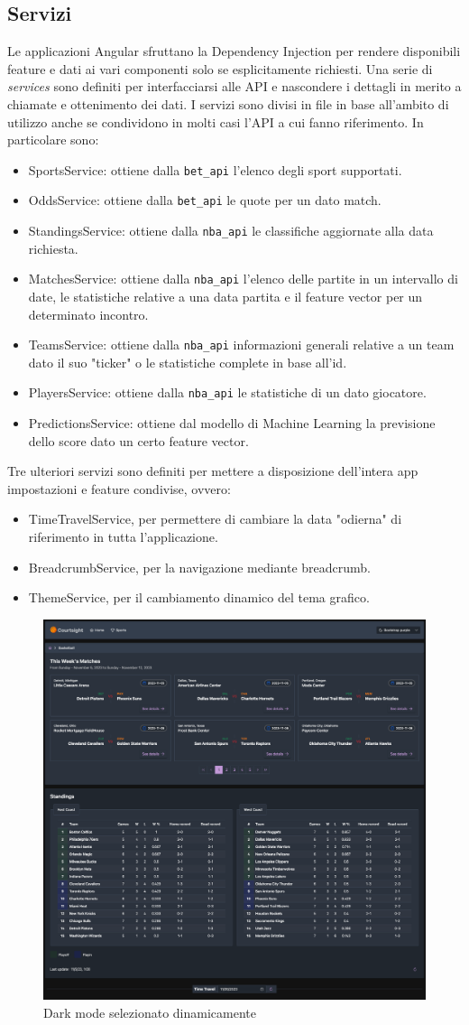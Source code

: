 \subsection{Servizi}
Le applicazioni Angular sfruttano la Dependency Injection per rendere disponibili feature e dati ai vari componenti solo se esplicitamente richiesti. Una serie di \textit{services} sono definiti per interfacciarsi alle API e nascondere i dettagli in merito a chiamate e ottenimento dei dati.
I servizi sono divisi in file in base all'ambito di utilizzo anche se condividono in molti casi l'API a cui fanno riferimento. In particolare sono:
\begin{itemize}
    \item SportsService: ottiene dalla \texttt{bet\_api} l'elenco degli sport supportati.
    \item OddsService: ottiene dalla \texttt{bet\_api} le quote per un dato match.
    \item StandingsService: ottiene dalla \texttt{nba\_api} le classifiche aggiornate alla data richiesta.
    \item MatchesService: ottiene dalla \texttt{nba\_api} l'elenco delle partite in un intervallo di date, le statistiche relative a una data partita e il feature vector per un determinato incontro.
    \item TeamsService: ottiene dalla \texttt{nba\_api} informazioni generali relative a un team dato il suo "ticker" o le statistiche complete in base all'id.
    \item PlayersService: ottiene dalla \texttt{nba\_api} le statistiche di un dato giocatore.
    \item PredictionsService: ottiene dal modello di Machine Learning la previsione dello score dato un certo feature vector.
\end{itemize}
Tre ulteriori servizi sono definiti per mettere a disposizione dell'intera app impostazioni e feature condivise, ovvero:
\begin{itemize}
    \item TimeTravelService, per permettere di cambiare la data "odierna" di riferimento in tutta l'applicazione.
    \item BreadcrumbService, per la navigazione mediante breadcrumb.
    \item ThemeService, per il cambiamento dinamico del tema grafico.
\end{itemize}
\begin{figure}[H]
    \centering
    \includegraphics[width=0.75\linewidth]{img/webapp/themes.png}
    \caption{Dark mode selezionato dinamicamente}
    \label{fig:enter-label}
\end{figure}
